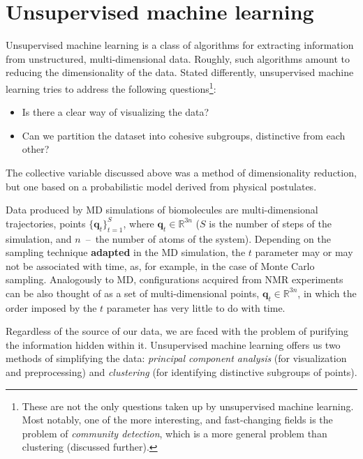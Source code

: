 \section{Unsupervised machine learning}


Unsupervised machine learning is a class of algorithms for extracting information from unstructured, multi-dimensional data.
Roughly, such algorithms amount to reducing the dimensionality of the data.
Stated differently, unsupervised machine learning tries to address the following questions\footnote{
These are not the only questions taken up by unsupervised machine learning.
Most notably, one of the more interesting, and fast-changing fields is the problem of \emph{community detection}, which is a more general problem than clustering (discussed further).}:
\begin{itemize}
 \item Is there a clear way of visualizing the data?
 \item Can we partition the dataset into cohesive subgroups, distinctive from each other?
\end{itemize}
The collective variable discussed above was a method of dimensionality reduction, but one based on a probabilistic model derived from physical postulates.

Data produced by MD simulations of biomolecules are multi-dimensional trajectories, points $\{ \mathbf{q}_t \}_{t=1}^S$, where $\mathbf{q}_t\in\mathbb{R}^{3n}$ ($S$ is the number of steps of the simulation, and $n$~--~the number of atoms of the system).
Depending on the sampling technique {\bf adapted} in the MD simulation, the $t$ parameter may or may not be associated with time, as, for example, in the case of Monte Carlo sampling.
Analogously to MD, configurations acquired from NMR experiments can be also thought of as a set of multi-dimensional points, $\mathbf{q}_t\in\mathbb{R}^{3n}$, in which the order imposed by the $t$ parameter has very little to do with time.

Regardless of the source of our data, we are faced with the problem of purifying the information hidden within it.
Unsupervised machine learning offers us two methods of simplifying the data: \emph{principal component analysis} (for visualization and preprocessing) and \emph{clustering} (for identifying distinctive subgroups of points).

